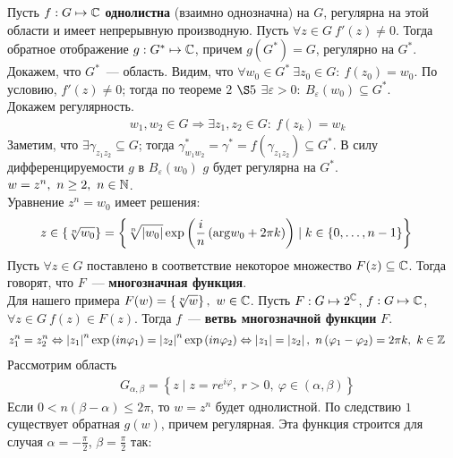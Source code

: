 \corollary
Пусть $f: G \mapsto \mathbb{C}$ \textbf{однолистна} (взаимно однозначна) на $G$,
регулярна на этой области и имеет непрерывную производную. Пусть $\forall z \in
G \ f'(z) \neq 0$. Тогда обратное отображение $g: G^* \mapsto \mathbb{C}$, причем
$g(G^*) = G$, регулярно на $G^*$.
\pr
Докажем, что $G^*$~--- область. Видим, что $\forall w_0 \in G^* \ \exists z_0
\in G: \ f(z_0) = w_0$. По условию, $f'(z) \neq 0$; тогда по теореме $2$ $\S 5$
$\exists \varepsilon > 0: \ B_\varepsilon(w_0) \subseteq G^*$.
\\
Докажем регулярность.
\begin{align*}
  & w_1, w_2 \in G \Rightarrow \exists z_1, z_2 \in G: \ f(z_k) = w_k
\end{align*}
Заметим, что $\exists \gamma_{z_1z_2} \subseteq G$; тогда $\gamma_{w_1w_2}^* =
\gamma^* = f(\gamma_{z_1z_2}) \subseteq G^*$.
В силу дифференцируемости $g$ в $B_\varepsilon(w_0)$ $g$ будет регулярна на
$G^*$.
\Example
$w = z^n, \ n \geq 2, \ n \in \mathbb{N}$.
\\
Уравнение $z^n = w_0$ имеет решения:
\begin{align*}
  & z \in \left\{ \sqrt[n]{w_0} \right\} = \left\{ \sqrt[n]{\left| w_0 \right|} \exp \left( \displaystyle \frac{i}{n}\left( \mathrm{arg} w_0 + 2 \pi k \right) \right) \mid k \in \left\{0, \dots, n-1 \right\} \right\}
\end{align*}
\Def
Пусть $\forall z \in G$ поставлено в соответствие некоторое множество $F(z)
\subseteq \mathbb{C}$. Тогда говорят, что $F$~--- \textbf{многозначная функция}.
\\
Для нашего примера $F(w) = \left\{ \sqrt[n]{w} \right\}, \ w \in \mathbb{C}$.
\Def
Пусть $F: G \mapsto 2^{\mathbb{C}}$, $f: G \mapsto \mathbb{C}$, $\forall z \in G \ f(z)\in
F(z)$. Тогда $f$~--- \textbf{ветвь многозначной функции} $F$.
\Example
\begin{align*}
  & z_1^n = z_2^n \Leftrightarrow \left| z_1 \right|^n \exp \left( in\varphi_1 \right) = \left| z_2 \right|^n \exp \left( in\varphi_2 \right) \Leftrightarrow \left| z_1 \right| = \left|z_2\right|, \ n\left( \varphi_1 - \varphi_2 \right) = 2 \pi k, \ k \in \mathbb{Z}
\end{align*}
Рассмотрим область
\begin{align*}
  & G_{\alpha, \beta} = \left\{ z \mid z = re^{i \varphi}, \ r>0, \ \varphi \in \left( \alpha, \beta \right) \right\}
\end{align*}
Если $0 < n(\beta - \alpha) \leq 2 \pi$, то $w = z^n$ будет однолистной. По
следствию $1$ существует обратная $g(w)$, причем регулярная. Эта функция
строится для случая $\alpha = -\frac{\pi}{2}$, $\beta = \frac{\pi}{2}$ так:

